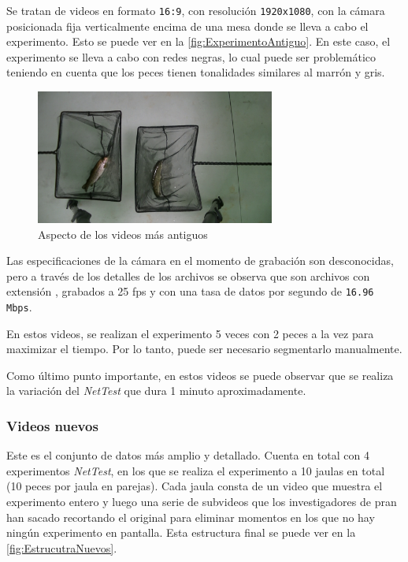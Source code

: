 Se tratan de videos en formato \texttt{16:9}, con resolución \texttt{1920x1080}, con la cámara posicionada fija verticalmente encima de una mesa donde se lleva a cabo el experimento. Esto se puede ver 
en la \autoref{fig:ExperimentoAntiguo}. En este caso, el experimento se lleva a cabo con redes negras, lo cual puede ser problemático teniendo en cuenta que los peces tienen 
tonalidades similares al marrón y gris.

\begin{figure}[h]
    \centering
    \includegraphics[width=0.70\textwidth]{images/3/ExperimentoAntiguo.png}
    \caption{Aspecto de los videos más antiguos}
    \label{fig:ExperimentoAntiguo}
\end{figure}

Las especificaciones de la cámara en el momento de grabación son desconocidas, pero a través de los detalles de los archivos se observa que son archivos con extensión 
\texttt{}, grabados a 25 \acrshort{fps} y con una tasa de datos por segundo de \texttt{16.96 Mbps}.

En estos videos, se realizan el experimento 5 veces con 2 peces a la vez para maximizar el tiempo. Por lo tanto, puede ser necesario segmentarlo manualmente.

Como último punto importante, en estos videos se puede observar que se realiza la variación del \textit{NetTest} que dura 1 minuto aproximadamente.

\subsubsection{Videos nuevos}

Este es el conjunto de datos más amplio y detallado. Cuenta en total con 4 experimentos \textit{NetTest}, en los que se realiza el experimento a 10 jaulas en total (10 peces por jaula en parejas). 
Cada jaula consta de un  video que muestra el experimento entero y luego una serie de subvideos que los investigadores de \acrshort{pran} han sacado recortando el original para eliminar 
momentos en los que no hay ningún experimento en pantalla. Esta estructura final se puede ver en la \autoref{fig:EstrucutraNuevos}.

